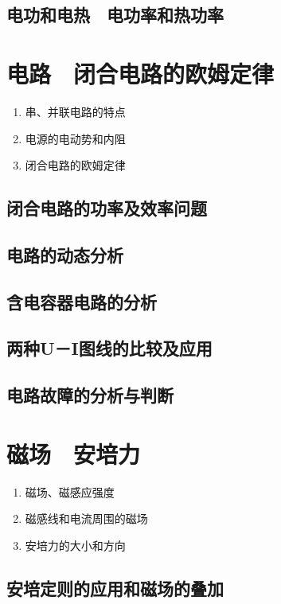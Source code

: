\documentclass[cn,11pt,mac, simple]{elegantbook}
\begin{document}
\clearpage\section{电功和电热　电功率和热功率}
\chapter{电路　闭合电路的欧姆定律}
\begin{enumerate}
   \item 串、并联电路的特点
   \item 电源的电动势和内阻
   \item 闭合电路的欧姆定律
\end{enumerate}

\clearpage\section{闭合电路的功率及效率问题}

\clearpage\section{电路的动态分析}

\clearpage\section{含电容器电路的分析}

\clearpage\section{两种U－I图线的比较及应用}

\clearpage\section{电路故障的分析与判断}
\chapter{磁场　安培力}
\begin{enumerate}
   \item 磁场、磁感应强度
   \item 磁感线和电流周围的磁场
   \item 安培力的大小和方向
\end{enumerate}

\clearpage\section{安培定则的应用和磁场的叠加}
\end{document}
